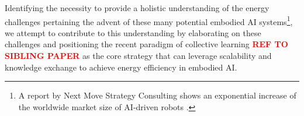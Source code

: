 Identifying the necessity to provide a holistic understanding of the energy challenges pertaining the advent of these many potential embodied AI systems\footnote{A report by Next Move Strategy Consulting shows an exponential increase of the worldwide market size of AI-driven robots \cite{statista_ai_robots_market_size}.}, we attempt to contribute to this understanding by elaborating on these challenges and positioning the recent paradigm of collective learning \textbf{\textcolor{red}{REF TO SIBLING PAPER}} as the core strategy that can leverage scalability and knowledge exchange to achieve energy efficiency in embodied AI.